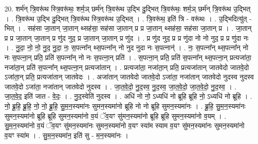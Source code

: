 \documentclass[17pt]{extarticle}
\begin{document}
20. शर्म॑न् त्रि॒वरू॑थ स्त्रि॒वरू॑थः॒ शर्म॒ञ् छर्म॑न् त्रि॒वरू॑थ उ॒द्भि दु॒द्भित् त्रि॒वरू॑थः॒ शर्म॒ञ् छर्म॑न् त्रि॒वरू॑थ उ॒द्भित् । . त्रि॒वरू॑थ उ॒द्भि दु॒द्भित् त्रि॒वरू॑थ स्त्रि॒वरू॑थ उ॒द्भित् । . त्रि॒वरू॑थ॒ इति॑ त्रि - वरू॑थः । . उ॒द्भिदित्यु॑त् - भित् । . सह॑सा जा॒तान् जा॒तान् थ्सह॑सा॒ सह॑सा जा॒तान् प्र प्र जा॒तान् थ्सह॑सा॒ सह॑सा जा॒तान् प्र । . जा॒तान् प्र प्र जा॒तान् जा॒तान् प्र णु॑द नुद॒ प्र जा॒तान् जा॒तान् प्र णु॑द । . प्र णु॑द नुद॒ प्र प्र णु॑दा नो नो नुद॒ प्र प्र णु॑दा नः । . नु॒दा॒ नो॒ नो॒ नु॒द॒ नु॒दा॒ नः॒ स॒पत्ना᳚न् थ्स॒पत्ना᳚न् नो नुद नुदा नः स॒पत्नान्॑ । . नः॒ स॒पत्ना᳚न् थ्स॒पत्ना᳚न् नो नः स॒पत्ना॒न् प्रति॒ प्रति॑ स॒पत्ना᳚न् नो नः स॒पत्ना॒न् प्रति॑ । . स॒पत्ना॒न् प्रति॒ प्रति॑ स॒पत्ना᳚न् थ्स॒पत्ना॒न् प्रत्यजा॑ता॒ नजा॑ता॒न् प्रति॑ स॒पत्ना᳚न् थ्स॒पत्ना॒न् प्रत्यजा॑तान् । . प्रत्यजा॑ता॒ नजा॑ता॒न् प्रति॒ प्रत्यजा॑तान् जातवेदो जातवे॒दो ऽजा॑ता॒न् प्रति॒ प्रत्यजा॑तान् जातवेदः । . अजा॑तान् जातवेदो जातवे॒दो ऽजा॑ता॒ नजा॑तान् जातवेदो नुदस्व नुदस्व जातवे॒दो ऽजा॑ता॒ नजा॑तान् जातवेदो नुदस्व । . जा॒त॒वे॒दो॒ नु॒द॒स्व॒ नु॒द॒स्व॒ जा॒त॒वे॒दो॒ जा॒त॒वे॒दो॒ नु॒द॒स्व॒ । . जा॒त॒वे॒द॒ इति॑ जात - वे॒दः॒ । . नु॒द॒स्वेति॑ नुदस्व । . अधि॑ नो नो॒ ऽध्यधि॑ नो ब्रूहि ब्रूहि नो॒ ऽध्यधि॑ नो ब्रूहि । . नो॒ ब्रू॒हि॒ ब्रू॒हि॒ नो॒ नो॒ ब्रू॒हि॒ सु॒म॒न॒स्यमा॑नः सुमन॒स्यमा॑नो ब्रूहि नो नो ब्रूहि सुमन॒स्यमा॑नः । . ब्रू॒हि॒ सु॒म॒न॒स्यमा॑नः सुमन॒स्यमा॑नो ब्रूहि ब्रूहि सुमन॒स्यमा॑नो व॒यं ॅव॒यꣳ सु॑मन॒स्यमा॑नो ब्रूहि ब्रूहि सुमन॒स्यमा॑नो व॒यम् । . सु॒म॒न॒स्यमा॑नो व॒यं ॅव॒यꣳ सु॑मन॒स्यमा॑नः सुमन॒स्यमा॑नो व॒यꣳ स्या॑म स्याम व॒यꣳ सु॑मन॒स्यमा॑नः सुमन॒स्यमा॑नो व॒यꣳ स्या॑म । . सु॒म॒न॒स्यमा॑न॒ इति॑ सु - म॒न॒स्यमा॑नः । \newline
\end{document}

